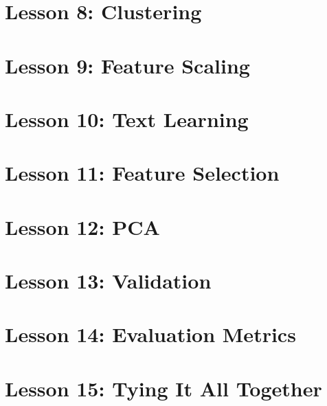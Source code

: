 \documentclass{article}
\begin{document}
\section{Lesson 8: Clustering}

\section{Lesson 9: Feature Scaling}

\section{Lesson 10: Text Learning}

\section{Lesson 11: Feature Selection}

\section{Lesson 12: PCA}

\section{Lesson 13: Validation}

\section{Lesson 14: Evaluation Metrics}

\section{Lesson 15: Tying It All Together}
\end{document}
